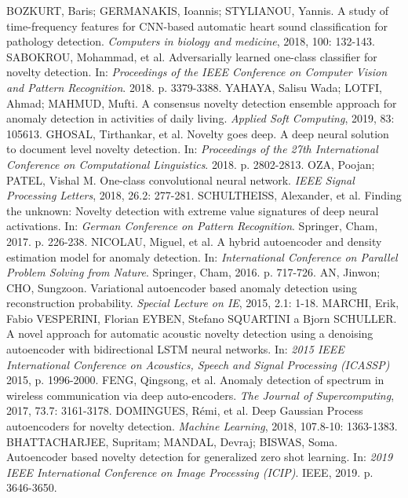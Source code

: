 \documentclass[11pt,twoside,openright]{report}
\begin{document}
\begin{thebibliography}{L}
BOZKURT, Baris; GERMANAKIS, Ioannis; STYLIANOU, Yannis. A study of time-frequency features for CNN-based automatic heart sound classification for pathology detection. \textit{Computers in biology and medicine}, 2018, 100: 132-143.
SABOKROU, Mohammad, et al. Adversarially learned one-class classifier for novelty detection. In: \textit{Proceedings of the IEEE Conference on Computer Vision and Pattern Recognition}. 2018. p. 3379-3388.
YAHAYA, Salisu Wada; LOTFI, Ahmad; MAHMUD, Mufti. A consensus novelty detection ensemble approach for anomaly detection in activities of daily living. \textit{Applied Soft Computing}, 2019, 83: 105613.
GHOSAL, Tirthankar, et al. Novelty goes deep. A deep neural solution to document level novelty detection. In: \textit{Proceedings of the 27th International Conference on Computational Linguistics}. 2018. p. 2802-2813.
OZA, Poojan; PATEL, Vishal M. One-class convolutional neural network. \textit{IEEE Signal Processing Letters}, 2018, 26.2: 277-281.
SCHULTHEISS, Alexander, et al. Finding the unknown: Novelty detection with extreme value signatures of deep neural activations. In: \textit{German Conference on Pattern Recognition}. Springer, Cham, 2017. p. 226-238.
NICOLAU, Miguel, et al. A hybrid autoencoder and density estimation model for anomaly detection. In: \textit{International Conference on Parallel Problem Solving from Nature}. Springer, Cham, 2016. p. 717-726.
AN, Jinwon; CHO, Sungzoon. Variational autoencoder based anomaly detection using reconstruction probability. \textit{Special Lecture on IE}, 2015, 2.1: 1-18.
MARCHI, Erik, Fabio VESPERINI, Florian EYBEN, Stefano SQUARTINI a Bjorn SCHULLER. A novel approach for automatic acoustic novelty detection using a denoising autoencoder with bidirectional LSTM neural networks. In: \textit{2015 IEEE International Conference on Acoustics, Speech and Signal Processing (ICASSP)} 2015, p. 1996-2000.
FENG, Qingsong, et al. Anomaly detection of spectrum in wireless communication via deep auto-encoders. \textit{The Journal of Supercomputing}, 2017, 73.7: 3161-3178.
DOMINGUES, Rémi, et al. Deep Gaussian Process autoencoders for novelty detection. \textit{Machine Learning}, 2018, 107.8-10: 1363-1383.
BHATTACHARJEE, Supritam; MANDAL, Devraj; BISWAS, Soma. Autoencoder based novelty detection for generalized zero shot learning. In: \textit{2019 IEEE International Conference on Image Processing (ICIP)}. IEEE, 2019. p. 3646-3650.

\end{thebibliography}
\end{document}
